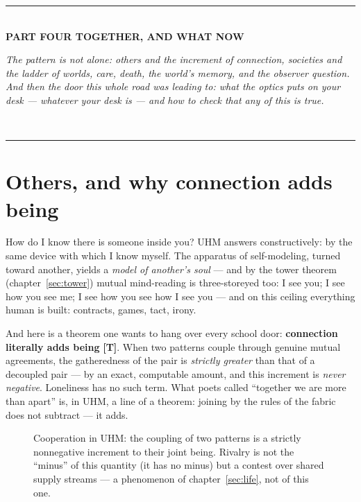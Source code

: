 \documentclass[11pt,letterpaper]{article}
\newcommand{\stT}{\textbf{[T]}\xspace}
\newcommand{\partline}[2]{%
  \clearpage\vspace*{4pt}\begin{center}
  {\color{fact}\rule{0.55\textwidth}{0.4pt}}\\[9pt]
  {\large\bfseries #1}\\[7pt]
  \begin{minipage}{0.82\textwidth}\centering\small\itshape\color{plosgray} #2\end{minipage}\\[9pt]
  {\color{fact}\rule{0.55\textwidth}{0.4pt}}
  \end{center}\bigskip}
\newcommand{\voiceroseneutral}[4]{%
  \foreach \vang in {90,141.4,192.8,244.3,295.7,347.1,38.6}{%
    \draw[plosgray!40] (#1,#2) -- ($(#1,#2)+(\vang:#3)$);
    \fill[plosblue!65] ($(#1,#2)+(\vang:#3)$) circle (#4);}}
\begin{document}
\partline{PART FOUR \;\textperiodcentered\; TOGETHER, AND WHAT NOW}{The pattern is not
alone: others and the increment of connection, societies and the ladder of worlds, care,
death, the world's memory, and the observer question. And then the door this whole road was
leading to: what the optics puts on your desk --- whatever your desk is --- and how to check
that any of this is true.}

\section{Others, and why connection adds being}
\label{sec:others}

How do I know there is someone inside you? UHM answers
constructively: by the same device with which I know myself. The
apparatus of self-modeling, turned toward another, yields a
\emph{model of another's soul} --- and by the tower theorem
(chapter~\ref{sec:tower}) mutual mind-reading is three-storeyed too:
I see you; I see how you see me; I see how you see how I see you ---
and on this ceiling everything human is built: contracts, games,
tact, irony.

And here is a theorem one wants to hang over every school door:
\textbf{connection literally adds being} \stT. When two patterns
couple through genuine mutual agreements, the gatheredness of the
pair is \emph{strictly greater} than that of a decoupled pair ---
by an exact, computable amount, and this increment is \emph{never
negative}. Loneliness has no such term. What poets called ``together
we are more than apart'' is, in UHM, a line of a theorem: joining by
the rules of the fabric does not subtract --- it adds.

\begin{figure}[H]
\centering
{}
\caption{Cooperation in UHM: the coupling of two patterns is a
strictly nonnegative increment to their joint being. Rivalry is not
the ``minus'' of this quantity (it has no minus) but a contest over
shared supply streams --- a phenomenon of
chapter~\ref{sec:life}, not of this one.}
\label{fig:bridge}
\end{figure}
\end{document}
